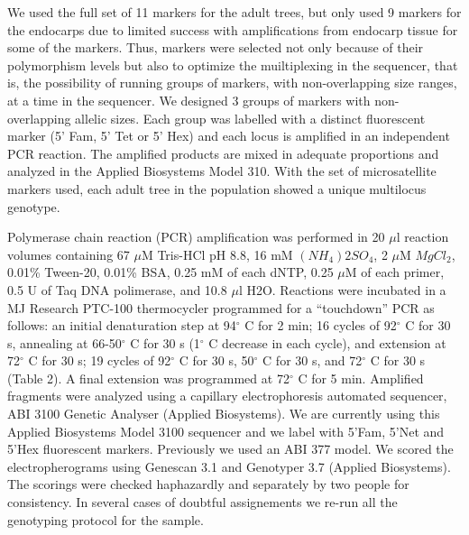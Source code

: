 \documentclass[a4paper,12pt]{article}
\newcommand{\tab}{\hspace{5mm}}
\begin{document}
\tab We used the full set of 11 markers for the adult trees, but only used 9 markers for the endocarps due to limited success with amplifications from endocarp tissue for some of the markers. Thus, markers were selected not only because of their polymorphism levels but also to optimize the muiltiplexing in the sequencer, that is, the possibility of running groups of markers, with non-overlapping size ranges, at a time in the sequencer. We designed 3 groups of markers with non-overlapping allelic sizes. Each group was labelled with a distinct fluorescent marker (5' Fam, 5' Tet or 5' Hex) and each locus is amplified in an independent PCR reaction. The amplified products are mixed in adequate proportions and analyzed in the Applied Biosystems Model 310. With the set of microsatellite markers used, each adult tree in the population showed a unique multilocus genotype.

\tab Polymerase chain reaction (PCR) amplification was performed in 20 \ensuremath{\mu}l reaction volumes containing 67 \ensuremath{\mu}M Tris-HCl pH 8.8, 16 mM $(NH_{4})2SO_{4}$, 2 \ensuremath{\mu}M $MgCl_2$, 0.01\% Tween-20, 0.01\% BSA, 0.25 mM of each dNTP, 0.25 \ensuremath{\mu}M of each primer, 0.5 U of Taq DNA polimerase, and 10.8 \ensuremath{\mu}l H2O. Reactions were incubated in a MJ Research PTC-100 thermocycler programmed for a ``touchdown'' PCR as follows: an initial denaturation step at 94\ensuremath{^\circ} C for 2 min; 16 cycles of 92\ensuremath{^\circ} C for 30 s, annealing at 66-50\ensuremath{^\circ} C for 30 s (1\ensuremath{^\circ} C decrease in each cycle), and extension at 72\ensuremath{^\circ} C for 30 s; 19 cycles of 92\ensuremath{^\circ} C for 30 s, 50\ensuremath{^\circ} C for 30 s, and 72\ensuremath{^\circ} C for 30 s (Table 2). A final extension was programmed at 72\ensuremath{^\circ} C for 5 min. Amplified fragments were analyzed using a capillary electrophoresis automated sequencer, ABI 3100 Genetic Analyser (Applied Biosystems). We are currently using this Applied Biosystems Model 3100 sequencer and we label with 5'Fam, 5'Net and 5'Hex fluorescent markers. Previously we used an ABI 377 model. We scored the electropherograms using Genescan 3.1 and Genotyper 3.7 (Applied Biosystems). The scorings were checked haphazardly and separately by two people for consistency. In several cases of doubtful assignements we re-run all the genotyping protocol for the sample.
\end{document}
